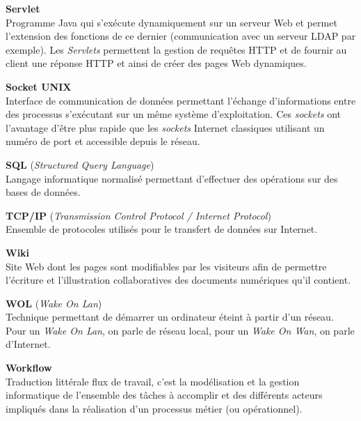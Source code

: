 \vspace{0.5cm}

\textbf{Servlet}\\
Programme Java qui s'ex\'ecute dynamiquement sur un serveur Web et permet l'extension des fonctions de ce dernier (communication avec un serveur LDAP par exemple).
Les \textit{Servlets} permettent la gestion de requ\^etes HTTP et de fournir au client une r\'eponse HTTP et ainsi de cr\'eer des pages Web dynamiques.

\vspace{0.5cm}

\textbf{Socket UNIX}\\
Interface de communication de donn\'ees permettant l'\'echange d'informations entre des processus s'ex\'ecutant sur un m\^eme syst\`eme d'exploitation.
Ces \textit{sockets} ont l'avantage d'\^etre plus rapide que les \textit{sockets} Internet classiques utilisant un num\'ero de port et accessible depuis le r\'eseau.

\vspace{0.5cm}

\textbf{SQL} (\textit{Structured Query Language})\\
Langage informatique normalis\'e permettant d'effectuer des op\'erations sur des bases de donn\'ees.

\vspace{0.5cm}

\textbf{TCP/IP} (\textit{Transmission Control Protocol / Internet Protocol})\\
Ensemble de protocoles utilis\'es pour le transfert de donn\'ees sur Internet.

\vspace{0.5cm}

\textbf{Wiki}\\
Site Web dont les pages sont modifiables par les visiteurs afin de permettre l'\'ecriture et l'illustration collaboratives des documents num\'eriques qu'il contient.

\vspace{0.5cm}

\textbf{WOL} (\textit{Wake On Lan})\\
Technique permettant de d\'emarrer un ordinateur \'eteint \`a partir d'un r\'eseau. 
Pour un \textit{Wake On Lan}, on parle de r\'eseau local, pour un \textit{Wake On Wan}, on parle d'Internet.

\vspace{0.5cm}

\textbf{Workflow}\\
Traduction litt\'erale \og{}flux de travail\fg{}, c'est la mod\'elisation et la gestion informatique de l'ensemble des t\^aches \`a accomplir et des diff\'erents acteurs impliqu\'es dans la r\'ealisation d'un processus m\'etier (ou op\'erationnel).

\clearpage
